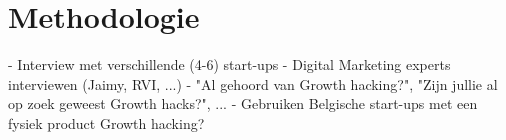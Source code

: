 
\chapter{Methodologie}
\label{ch:methodologie}


- Interview met verschillende (4-6) start-ups
- Digital Marketing experts interviewen (Jaimy, RVI, ...)
- "Al gehoord van Growth hacking?", "Zijn jullie al op zoek geweest Growth hacks?", ...
- Gebruiken Belgische start-ups met een fysiek product Growth hacking?


